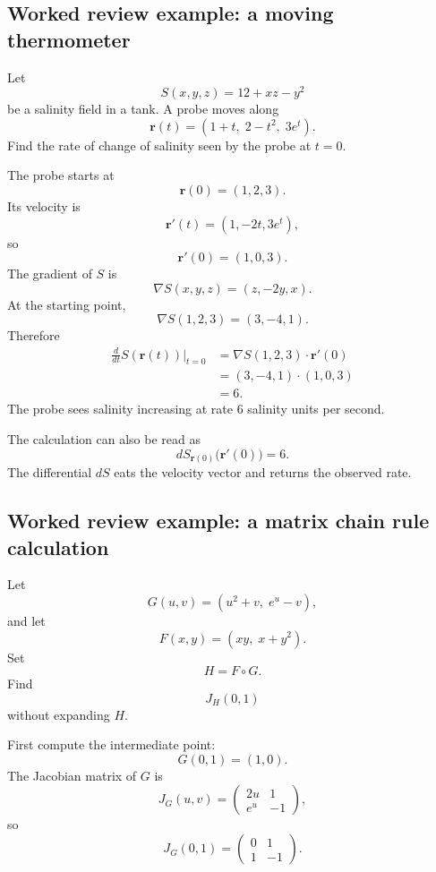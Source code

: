 \subsection{Worked review example: a moving thermometer}

Let
\[
    S(x,y,z)=12+xz-y^2
\]
be a salinity field in a tank.  A probe moves along
\[
    \mathbf r(t)=(1+t,\;2-t^2,\;3e^t).
\]
Find the rate of change of salinity seen by the probe at \(t=0\).

The probe starts at
\[
    \mathbf r(0)=(1,2,3).
\]
Its velocity is
\[
    \mathbf r'(t)=(1,-2t,3e^t),
\]
so
\[
    \mathbf r'(0)=(1,0,3).
\]
The gradient of \(S\) is
\[
    \nabla S(x,y,z)=(z,-2y,x).
\]
At the starting point,
\[
    \nabla S(1,2,3)=(3,-4,1).
\]
Therefore
\[
\begin{aligned}
    \frac{d}{dt}S(\mathbf r(t))\bigg|_{t=0}
    &=
    \nabla S(1,2,3)\cdot\mathbf r'(0)\\
    &=
    (3,-4,1)\cdot(1,0,3)\\
    &=
    6.
\end{aligned}
\]
The probe sees salinity increasing at rate \(6\) salinity units per second.

The calculation can also be read as
\[
    dS_{\mathbf r(0)}\bigl(\mathbf r'(0)\bigr)=6.
\]
The differential \(dS\) eats the velocity vector and returns the observed rate.

\subsection{Worked review example: a matrix chain rule calculation}

Let
\[
    G(u,v)=(u^2+v,\;e^u-v),
\]
and let
\[
    F(x,y)=(xy,\;x+y^2).
\]
Set
\[
    H=F\circ G.
\]
Find
\[
    J_H(0,1)
\]
without expanding \(H\).

First compute the intermediate point:
\[
    G(0,1)=(1,0).
\]
The Jacobian matrix of \(G\) is
\[
    J_G(u,v)=
    \begin{pmatrix}
        2u & 1\\
        e^u & -1
    \end{pmatrix},
\]
so
\[
    J_G(0,1)=
    \begin{pmatrix}
        0 & 1\\
        1 & -1
    \end{pmatrix}.
\]

